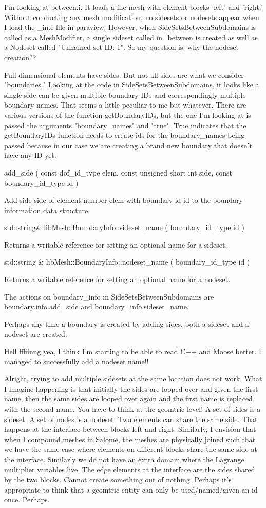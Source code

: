 I'm looking at between.i. It loads a file mesh with element blocks 'left' and 'right.' Without conducting any mesh modification, no sidesets or nodesets appear when I load the _in.e file in paraview. However, when SideSetsBetweenSubdomains is called as a MeshModifier, a single sideset called in_between is created as well as a Nodeset called "Unnamed set ID: 1". So my question is: why the nodeset creation??

Full-dimensional elements have sides. But not all sides are what we consider "boundaries." Looking at the code in SideSetsBetweenSubdomains, it looks like a single side can be given multiple boundary IDs and correspondingly multiple boundary names. That seems a little peculiar to me but whatever. There are various versions of the function getBoundaryIDs, but the one I'm looking at is passed the arguments "boundary_names" and "true". True indicates that the getBoundaryIDs function needs to create ids for the boundary_names being passed because in our case we are creating a brand new boundary that doesn't have any ID yet.


add_side 	( 	const dof_id_type  	elem,
		const unsigned short int  	side,
		const boundary_id_type  	id
	)

Add side side of element number elem with boundary id id to the boundary information data structure.

std::string& libMesh::BoundaryInfo::sideset_name 	( 	boundary_id_type  	id	)

Returns a writable reference for setting an optional name for a sideset.


std::string & libMesh::BoundaryInfo::nodeset_name 	( 	boundary_id_type  	id	)

Returns a writable reference for setting an optional name for a nodeset.

The actions on boundary_info in SideSetsBetweenSubdomains are boundary.info.add_side and boundary_info.sideset_name.

Perhaps any time a boundary is created by adding sides, both a sideset and a nodeset are created.

Hell fffiinng yea, I think I'm starting to be able to read C++ and Moose better. I managed to successfully add a nodeset name!!

Alright, trying to add multiple sidesets at the same location does not work. What I imagine happening is that initially the sides are looped over and given the first name, then the same sides are looped over again and the first name is replaced with the second name. You have to think at the geomtric level! A set of sides is a sideset. A set of nodes is a nodeset. Two elements can share the same side. That happens at the interface between blocks left and right. Similarly, I envision that when I compound meshes in Salome, the meshes are physically joined such that we have the same case where elements on different blocks share the same side at the interface. Similarly we do not have an extra domain where the Lagrange multiplier variables live. The edge elements at the interface are the sides shared by the two blocks. Cannot create something out of nothing. Perhaps it's appropriate to think that a geomtric entity can only be used/named/given-an-id once. Perhaps.

